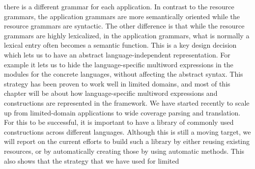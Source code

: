 \documentclass[output=paper]{LSP/langsci}
\begin{document}
there\ili{} is\ili{} a\ili{} different\ili{} grammar\ili{} for\ili{} each\ili{} application\ili{}.\ili{}
In\ili{} contrast\ili{} to\ili{} the\ili{} resource\ili{} grammars\ili{},\ili{} the\ili{} application\ili{} grammars\ili{}
are\ili{} more\ili{} semantically\ili{} oriented\ili{} while\ili{} the\ili{} resource\ili{} grammars\ili{} are\ili{} syntactic\ili{}.\ili{}
The\ili{} other\ili{} difference\ili{} is\ili{} that\ili{} while\ili{} the\ili{} resource\ili{} grammars\ili{} are\ili{} highly\ili{}
lexicalized\ili{},\ili{} in\ili{} the\ili{} application\ili{} grammars\ili{},\ili{} what\ili{} is\ili{} normally\ili{} a\ili{} lexical\ili{}
entry\ili{} often\ili{} becomes\ili{} a\ili{} semantic\ili{} function\ili{}.\ili{} This\ili{} is\ili{} a\ili{} key\ili{} design\ili{} decision\ili{}
which\ili{} lets\ili{} us\ili{} to\ili{} have\ili{} an\ili{} abstract\ili{} language\ili{}-independent\ili{}
representation\ili{}.\ili{} For\ili{} example\ili{} it\ili{} lets\ili{} us\ili{} to\ili{} hide\ili{} the\ili{} language\ili{}-specific\ili{}
multiword\ili{} expressions\ili{} in\ili{} the\ili{} modules\ili{} for\ili{} the\ili{} concrete\ili{} languages\ili{},\ili{}
without\ili{} affecting\ili{} the\ili{} abstract\ili{} syntax\ili{}.\ili{}
\ili{}
This\ili{} strategy\ili{} has\ili{} been\ili{} proven\ili{} to\ili{} work\ili{} well\ili{} in\ili{} limited\ili{} domains\ili{},\ili{} and\ili{} most\ili{} of\ili{}
this\ili{} chapter\ili{} will\ili{} be\ili{} about\ili{} how\ili{} language\ili{}-specific\ili{} multiword\ili{} expressions\ili{}
and\ili{} constructions\ili{} are\ili{} represented\ili{} in\ili{} the\ili{} framework\ili{}.\ili{}
\ili{}
We\ili{} have\ili{} started\ili{} recently\ili{} to\ili{} scale\ili{} up\ili{} from\ili{} limited\ili{}-domain\ili{}
applications\ili{} to\ili{} wide\ili{} coverage\ili{} parsing\ili{} and\ili{} translation\ili{}.\ili{} \ili{}
For\ili{} this\ili{} to\ili{} be\ili{} successful\ili{},\ili{} it\ili{} is\ili{} important\ili{} to\ili{} have\ili{} a\ili{} library\ili{}
of\ili{} commonly\ili{} used\ili{} constructions\ili{} across\ili{} different\ili{} languages\ili{}.\ili{} \ili{}
Although\ili{} this\ili{} is\ili{} still\ili{} a\ili{} moving\ili{} target\ili{},\ili{} we\ili{} will\ili{} report\ili{} on\ili{} the\ili{} current\ili{}
efforts\ili{} to\ili{} build\ili{} such\ili{} a\ili{} library\ili{} by\ili{} either\ili{} reusing\ili{} existing\ili{} resources\ili{},\ili{}
or\ili{} by\ili{} automatically\ili{} creating\ili{} those\ili{} by\ili{} using\ili{} automatic\ili{} methods\ili{}.\ili{}
This\ili{} also\ili{} shows\ili{} that\ili{} the\ili{} strategy\ili{} that\ili{} we\ili{} have\ili{} used\ili{} for\ili{} limited\ili{}
\end{document}
